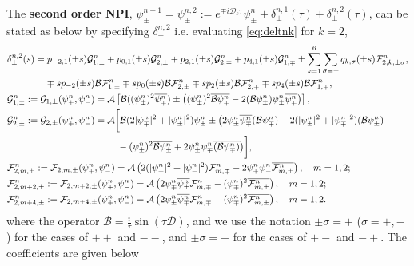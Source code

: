 \documentclass[final,leqno,showlabe]{siamltex}
\begin{document}
The {\bf second order NPI},  $\psi_{\pm}^{n+1}=\psi_{\pm}^{n,2}:=e^{\mp i\mathcal{D}_\varepsilon \tau}\psi_\pm^{n}+\delta_{\pm}^{n,1}(\tau)+\delta_{\pm}^{n,2}(\tau)$, can be stated as below by specifying $\delta_{\pm}^{n,2}$ i.e. evaluating \eqref{eq:deltnk} for $k=2$,
\begin{align}
&\delta_{\pm}^{n,2}(s)=p_{-2,1}(\pm s)\mathcal{G}_{1,\pm}^n+ p_{0,1}(\pm s)\mathcal{G}_{2,\pm}^n+ p_{2,1}(\pm s)\mathcal{G}_{2,\mp}^n+ p_{4,1}(\pm s)\mathcal{G}_{1,\mp}^n \pm\sum_{k=1}^6\sum\limits_{\sigma=\pm}q_{k,\sigma}(\pm s)\mathcal{F}_{2,k,\pm\sigma}^n,\nonumber\\
&\qquad\qquad\mp sp_{-2}(\pm s)\mathcal{B}\mathcal{F}_{1,\pm}^n\mp s p_0(\pm s)\mathcal{B}\mathcal{F}_{2,\pm}^n\mp sp_{2}(\pm s)\mathcal{B}\mathcal{F}_{2,\mp}^n\mp s p_{4}(\pm s)\mathcal{B}\mathcal{F}_{1,\mp}^n,\nonumber\\
&\mathcal{G}_{1,\pm}^n:=\mathcal{G}_{1,\pm}(\psi_+^n,\psi_-^n)=\mathcal{A}\left[\mathcal{B}((\psi_\pm^n)^2\overline{\psi_\mp^n})\pm \left((\psi_\pm^n)^2\overline{\mathcal{B}\psi_\mp^n}-2(\mathcal{B}\psi_\pm^n)\psi_\pm^n\overline{\psi_\mp^n}\right)\right],\nonumber\\
&\mathcal{G}_{2,\pm}^n:=\mathcal{G}_{2,\pm}(\psi_+^n,\psi_-^n)=\mathcal{A}\bigg[
\mathcal{B}(2|\psi_\mp^n|^2+|\psi_\pm^n|^2)\psi_\pm^n \pm\big(2\psi_\pm^n\overline{\psi_\mp^n}(\mathcal{B}\psi_\mp^n)-2(|\psi_\pm^n|^2+|\psi_{\mp}^n|^2)(\mathcal{B}\psi_\pm^n)\nonumber\\
&\hskip2cm\qquad\qquad\qquad-(\psi_\pm^n)^2\overline{\mathcal{B}\psi_\pm^n}+2\psi_\pm^n\psi_\mp^n\overline{(\mathcal{B}\psi_\mp^n)}\big)
\bigg],
\nonumber\\
&\mathcal{F}_{2,m,\pm}^n:=\mathcal{F}_{2,m,\pm}(\psi_+^n,\psi_-^n)=
\mathcal{A}\left(2(|\psi_+^n|^2+|\psi_-^n|^2)\mathcal{F}_{m,\mp}^n- 2\psi_+^n\psi_-^n\overline{\mathcal{F}_{m,\pm}^n}\right),\quad m=1,2;\nonumber\\
&\mathcal{F}_{2,m+2,\pm}^n:=\mathcal{F}_{2,m+2,\pm}(\psi_+^n,\psi_-^n)=
\mathcal{A}\left(2\psi_{\mp}^n\overline{\psi_{\pm}^n}\mathcal{F}_{m,\mp}^n- (\psi_\mp^n)^2\overline{\mathcal{F}_{m,\pm}^n}\right),\quad m=1,2;\nonumber\\
&\mathcal{F}_{2,m+4,\pm}^n:=\mathcal{F}_{2,m+4,\pm}(\psi_+^n,\psi_-^n)=
\mathcal{A}\left(2\psi_{\pm}^n\overline{\psi_{\mp}^n}\mathcal{F}_{m,\mp}^n- (\psi_\mp^n)^2\overline{\mathcal{F}_{m,\pm}^n}\right),\quad m=1,2.\nonumber
 \end{align}
 where the operator $ \mathcal{B}=\frac{i}{\tau}\sin(\tau\mathcal{D})$, and we use the notation $\pm\sigma=+$ ($\sigma=+,-$) for the cases of $++$ and $--$, and $\pm\sigma=-$ for the cases of $+-$ and $-+$. The coefficients are given below
\end{document}
